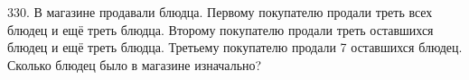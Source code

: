330. В магазине продавали блюдца. Первому покупателю продали треть всех блюдец и ещё треть блюдца. Второму покупателю продали треть оставшихся блюдец
и ещё треть блюдца. Третьему покупателю продали 7 оставшихся блюдец. Сколько блюдец было в магазине изначально?\\
